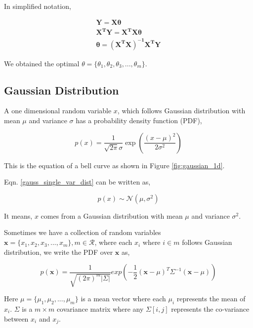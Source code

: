 \documentclass[english]{tktltiki}
\begin{document}
In simplified notation,

\begin{eqnarray}
\mathbf{Y} = \mathbf{X \theta} \nonumber \\
\mathbf{X^TY} = \mathbf{X^T X \theta} \nonumber \\
\mathbf{\theta} = \mathbf{(X^T X)^{-1} X^T Y}
\label{reg_param}
\end{eqnarray}

We obtained the optimal $\theta = \{\theta_1, \theta_2, \theta_3, ...,\theta_m\}$.

\subsection{Gaussian Distribution}

A one dimensional random variable $x$, which follows Gaussian distribution with mean $\mu$ and variance $\sigma$ has a probability density function (PDF),

\begin{equation}
p(x) = \frac{1}{\sqrt{2 \pi}\sigma} \exp(\frac{(x - \mu)^2}{2 \sigma^2})
\label{gauss_single_var_dist}
\end{equation}



This is the equation of a bell curve as shown in Figure \ref{fig:gaussian_1d}.

Eqn. \ref{gauss_single_var_dist} can be written as,

\begin{equation}
p(x) \sim \mathcal{N}(\mu, \sigma^2)
\label{gauss_single_var_sym}
\end{equation}

It means, $x$ comes from a Gaussian distribution with mean $\mu$ and variance $\sigma^2$.

Sometimes we have a collection of random variables $\mathbf{x} = \{x_1, x_2, x_3, ..., x_m\}, m \in \mathcal{R}$, where each $x_i$ where $i \in m$ follows Gaussian distribution, we write the PDF over $\mathbf{x}$ as,

\begin{equation}
p(\mathbf{x}) = \frac{1}{\sqrt{(2 \pi)^m |\Sigma|}}exp(-\frac{1}{2}(\mathbf{x} - \mu)^T \Sigma^{-1} (\mathbf{x} - \mu))
\label{gauss_multi_var_dist}
\end{equation}

Here $\mu = \{\mu_1, \mu_2, ..., \mu_m\}$ is a mean vector where each $\mu_i$ represents the mean of $x_i$. $\Sigma$ is a $m \times m$ covariance matrix where any $\Sigma[i, j]$ represents the co-variance between $x_i$ and $x_j$.
\end{document}
